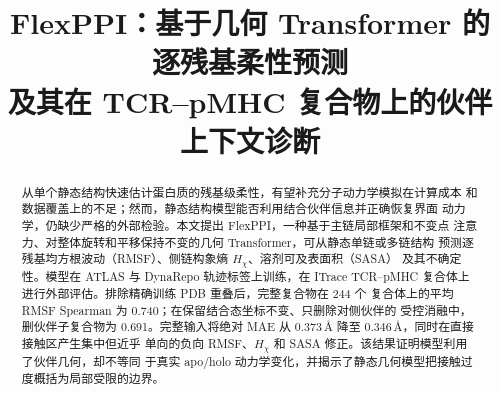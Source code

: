\documentclass[UTF8,a4paper,12pt]{ctexart}
\title{FlexPPI：基于几何 Transformer 的逐残基柔性预测\\及其在 TCR--pMHC 复合物上的伙伴上下文诊断}
\author{}
\date{}
\begin{document}
\maketitle

\begin{abstract}
从单个静态结构快速估计蛋白质的残基级柔性，有望补充分子动力学模拟在计算成本
和数据覆盖上的不足；然而，静态结构模型能否利用结合伙伴信息并正确恢复界面
动力学，仍缺少严格的外部检验。本文提出 FlexPPI，一种基于主链局部框架和不变点
注意力、对整体旋转和平移保持不变的几何 Transformer，可从静态单链或多链结构
预测逐残基均方根波动（RMSF）、侧链构象熵 $H_\chi$、溶剂可及表面积（SASA）
及其不确定性。模型在 ATLAS 与 DynaRepo 轨迹标签上训练，在 ITrace
TCR--pMHC 复合体上进行外部评估。排除精确训练 PDB 重叠后，完整复合物在 244 个
复合体上的平均 RMSF Spearman 为 0.740；在保留结合态坐标不变、只删除对侧伙伴的
受控消融中，删伙伴子复合物为 0.691。完整输入将绝对 MAE 从
$0.373\,\text{\AA}$ 降至 $0.346\,\text{\AA}$，同时在直接接触区产生集中但近乎
单向的负向 RMSF、$H_\chi$ 和 SASA 修正。该结果证明模型利用了伙伴几何，却不等同
于真实 apo/holo 动力学变化，并揭示了静态几何模型把接触过度概括为局部受限的边界。
\end{abstract}











\end{document}
